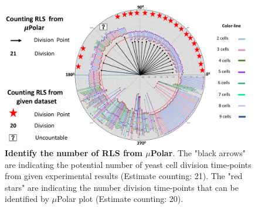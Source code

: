 \documentclass[conference]{IEEEtran}
\begin{document}
\begin{figure}
\centering
\includegraphics[width=\textwidth,height=10 cm]{Patterns/rlsTp1.pdf}
\caption{ \textbf{Identify the number of RLS from $\mu$Polar}. The "black arrows" are indicating the potential number of yeast cell division time-points from given experimental results (Estimate counting: 21). The "red stars" are indicating the number division time-points that can be identified by $\mu$Polar plot (Estimate counting: 20).}
\label{fig:rls}
\end{figure}



\end{document}
